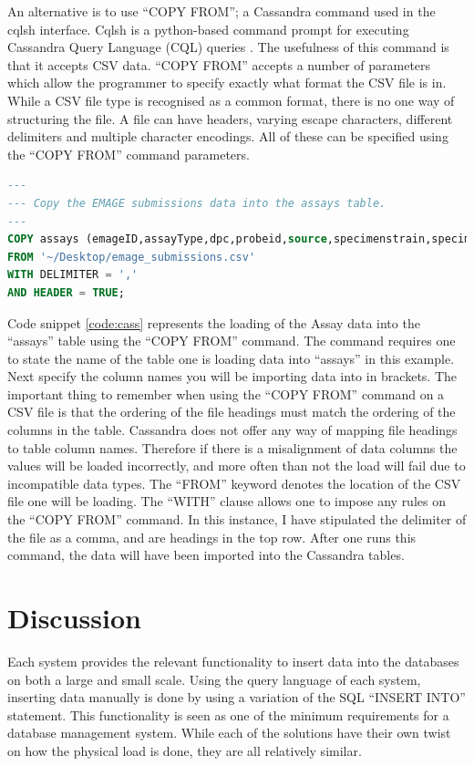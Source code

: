 An alternative is to use ``COPY FROM''; a Cassandra command used in the cqlsh interface. Cqlsh is a python-based command prompt for executing Cassandra Query Language (CQL) queries \cite{ds}. The usefulness of this command is that it accepts CSV data. ``COPY FROM'' accepts a number of parameters which allow the programmer to specify exactly what format the CSV file is in. While a CSV file type is recognised as a common format, there is no one way of structuring the file. A file can have headers, varying escape characters, different delimiters and multiple character encodings. All of these can be specified using the ``COPY FROM'' command parameters.

\begin{lstlisting}[language=SQL, caption=Loading data into Apache Cassandra using the cqlsh interface., label=code:cass]
---
--- Copy the EMAGE submissions data into the assays table.
---
COPY assays (emageID,assayType,dpc,probeid,source,specimenstrain,specimentype,theilerstage)
FROM '~/Desktop/emage_submissions.csv'
WITH DELIMITER = ','
AND HEADER = TRUE;
\end{lstlisting}

Code snippet \ref{code:cass} represents the loading of the Assay data into the ``assays'' table using the ``COPY FROM'' command. The command requires one to state the name of the table one is loading data into ``assays'' in this example. Next specify the column names you will be importing data into in brackets.  The important thing to remember when using the ``COPY FROM'' command on a CSV file is that the ordering of the file headings must match the ordering of the columns in the table. Cassandra does not offer any way of mapping file headings to table column names. Therefore if there is a misalignment of data columns the values will be loaded incorrectly, and more often than not the load will fail due to incompatible data types. The ``FROM'' keyword denotes the location of the CSV file one will be loading. The ``WITH'' clause allows one to impose any rules on the ``COPY FROM'' command. In this instance, I have stipulated the delimiter of the file as a comma, and are headings in the top row. After one runs this command, the data will have been imported into the Cassandra tables.

\section{Discussion}\label{loaddiscussion}
Each system provides the relevant functionality to insert data into the databases on both a large and small scale. Using the query language of each system, inserting data manually is done by using a variation of the SQL ``INSERT INTO'' statement. This functionality is seen as one of the minimum requirements for a database management system. While each of the solutions have their own twist on how the physical load is done, they are all relatively similar.

